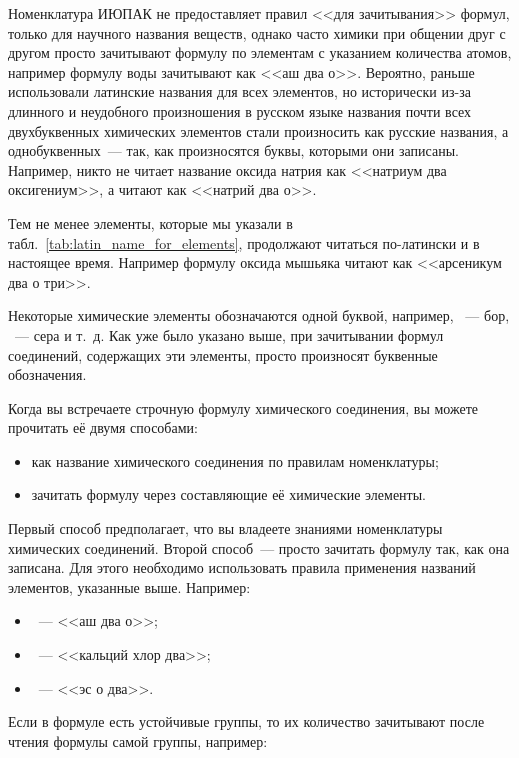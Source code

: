 Номенклатура ИЮПАК не предоставляет правил <<для зачитывания>> формул, только для научного названия веществ, однако часто химики при общении друг с другом просто зачитывают формулу по элементам с указанием количества атомов, например формулу воды  зачитывают как <<аш два о>>. Вероятно, раньше использовали латинские названия для всех элементов, но исторически из-за длинного и неудобного произношения в русском языке названия почти всех двухбуквенных химических элементов стали произносить как русские названия, а однобуквенных~--- так, как произносятся буквы, которыми они записаны. Например, никто не читает название оксида натрия  как <<натриум два оксигениум>>, а читают как <<натрий два о>>.

Тем не менее элементы, которые мы указали в табл.~\ref{tab:latin_name_for_elements}, продолжают читаться по-латински и в настоящее время. Например формулу оксида мышьяка  читают как <<арсеникум два о три>>.

Некоторые химические элементы обозначаются одной буквой, например, ~--- бор, ~--- сера и т.~д. Как уже было указано выше, при зачитывании формул соединений, содержащих эти элементы, просто произносят буквенные обозначения.

Когда вы встречаете строчную формулу химического соединения, вы можете прочитать её двумя способами:

\begin{itemize}
    \item как название химического соединения по правилам номенклатуры;
    \item зачитать формулу через составляющие её химические элементы.
\end{itemize}

Первый способ предполагает, что вы владеете знаниями номенклатуры химических соединений. Второй способ~--- просто зачитать формулу так, как она записана. Для этого необходимо использовать правила применения названий элементов, указанные выше. Например:

\begin{itemize}
    \item {}~--- <<аш два о>>;
    \item {}~--- <<кальций хлор два>>;
    \item {}~--- <<эс о два>>.
\end{itemize}

Если в формуле есть устойчивые группы, то их количество зачитывают после чтения формулы самой группы, например:

